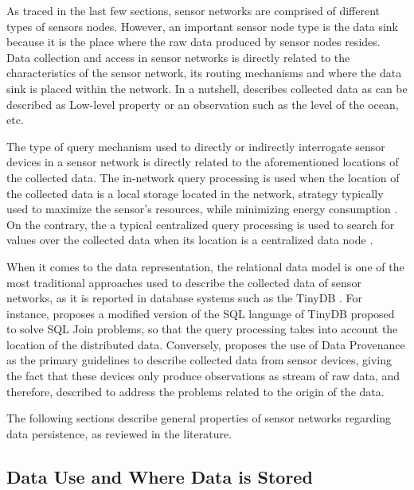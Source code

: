 As traced in the last few sections, sensor networks are comprised of
different types of sensors nodes. However, an important sensor node type is the
data sink because it is the place where the raw data produced by sensor
nodes resides. Data collection and access in sensor networks is directly
related to the characteristics of the sensor network, its routing mechanisms
and where the data sink is placed within the network. In a nutshell,
\cite{sn-storage03} describes collected data as can be described as Low-level
property or an observation such as the level of the ocean, etc.

The type of query mechanism used to directly or indirectly interrogate sensor
devices in a sensor network is directly related to the aforementioned locations
of the collected data. The in-network query processing is used when the
location of the collected data is a local storage \cite{sn-storage01,
sn-storage03} located in the network, strategy typically used to maximize the
sensor's resources, while minimizing energy consumption \cite{sn-storage04}. On
the contrary, the a typical centralized query processing is used to search for
values over the collected data when its location is a centralized data
node \cite{sn-storage02}.

When it comes to the data representation, the relational data model
\cite{relational-model} is one of the most traditional approaches used to
describe the collected data of sensor networks, as it is reported in database
systems such as the TinyDB \cite{sn-db-tinydb}. For instance, \cite{sn-db-newop}
proposes a modified version of the SQL language of TinyDB proposed to solve
SQL Join problems, so that the query processing takes into account the location
of the distributed data. Conversely, \cite{sn-provenance} proposes the use of
Data Provenance as the primary guidelines to describe collected data from
sensor devices, giving the fact that these devices only produce observations as
stream of raw data, and therefore, described to address the problems related to
the origin of the data.

The following sections describe general properties of sensor networks regarding
data persistence, as reviewed in the literature.

\subsection{Data Use and Where Data is Stored}
\label{sec:sn-data-purpose}
\label{sec:sn-storage-locations}

